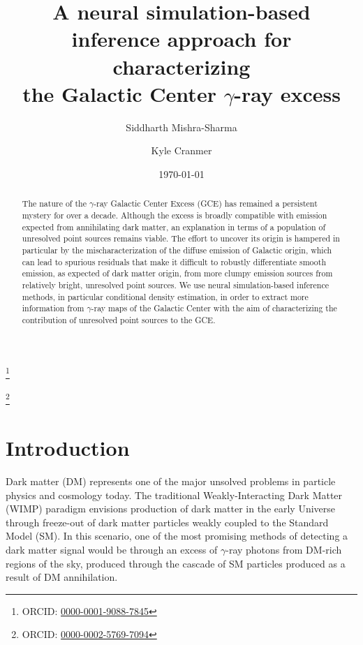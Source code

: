\documentclass[prd,aps,10pt,nofootinbib,twocolumn,superscriptaddress,preprintnumbers,balancelastpage,longbibliography]{revtex4-1}
\begin{document}
\title{A neural simulation-based inference approach for characterizing \\ the Galactic Center $\gamma$-ray excess}
 
\author{Siddharth Mishra-Sharma}
\thanks{ORCID: \href{https://orcid.org/0000-0001-9088-7845}{0000-0001-9088-7845}}

\author{Kyle Cranmer}
\thanks{ORCID: \href{https://orcid.org/0000-0002-5769-7094}{0000-0002-5769-7094}}

\date{\today}

\begin{abstract}
The nature of the \Fermi $\gamma$-ray Galactic Center Excess (GCE) has remained a persistent mystery for over a decade. Although the excess is broadly compatible with emission expected from annihilating dark matter, an explanation in terms of a population of unresolved point sources remains viable. The effort to uncover its origin is hampered in particular by the mischaracterization of the diffuse emission of Galactic origin, which can lead to spurious residuals that make it difficult to robustly differentiate smooth emission, as expected of dark matter origin, from more clumpy emission sources from relatively bright, unresolved point sources. We use neural simulation-based inference methods, in particular conditional density estimation, in order to extract more information from $\gamma$-ray maps of the Galactic Center with the aim of characterizing the contribution of unresolved point sources to the GCE.
\end{abstract}

\maketitle

\section{Introduction}
\label{sec:intro}

Dark matter (DM) represents one of the major unsolved problems in particle physics and cosmology today. The traditional Weakly-Interacting Dark Matter (WIMP) paradigm envisions production of dark matter in the early Universe through freeze-out of dark matter particles weakly coupled to the Standard Model (SM). In this scenario, one of the most promising methods of detecting a dark matter signal would be through an excess of $\gamma$-ray photons from DM-rich regions of the sky, produced through the cascade of SM particles produced as a result of DM annihilation. 
\end{document}
